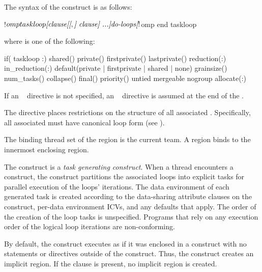 \begin{fortranspecific}
The syntax of the  construct is as follows:
\begin{ompfPragma}
!$omp taskloop \plc{[clause[[},\plc{] clause] ...]}
    \plc{do-loops}
\plc{[}!$omp end taskloop\plc{]}
\end{ompfPragma}
where  is one of the following:
\begin{indentedcodelist}
if(\plc{[} taskloop :\plc{] scalar-logical-expression})
shared()
private()
firstprivate()
lastprivate()
reduction(:)
in_reduction(:)
default(private \textnormal{|} firstprivate \textnormal{|} shared \textnormal{|} none)
grainsize()
num_tasks()
collapse()
final()
priority()
untied
mergeable
nogroup
allocate(\plc{[allocator }:\plc{] list})
\end{indentedcodelist}

If an ~ directive is not specified, an
~ directive is assumed at the end of the
.

The  directive places restrictions on the structure of all
associated . Specifically, all associated  must
have canonical loop form (see ).
\end{fortranspecific}

\binding
The binding thread set of the  region is the current team. A  region binds to the innermost enclosing  region.

\descr
The  construct is a \emph{task generating construct}. When a thread encounters a  construct, the construct partitions the associated loops into explicit tasks for parallel execution of the loops' iterations. The data environment of each generated task is created according to the data-sharing attribute clauses on the  construct, per-data environment ICVs, and any defaults that apply. The order of the creation of the loop tasks is unspecified.
Programs that rely on any execution order of the logical loop iterations are non-conforming.

By default, the  construct executes as if it was enclosed in a  construct with no statements or directives outside of the  construct. Thus, the  construct creates an implicit  region. If the  clause is present, no implicit  region is created.

